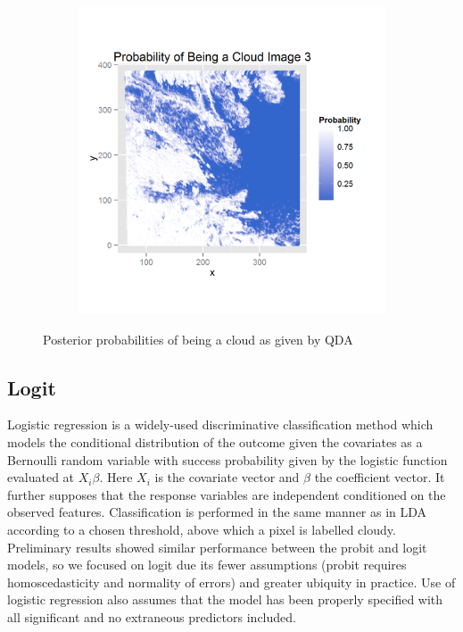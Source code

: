 \documentclass{article}\usepackage[]{graphicx}\usepackage[]{color}
\begin{document}
\begin{figure}[h]
\begin{subfigure}[b]{0.3\textwidth}
    \label{qda2}
  \end{subfigure}  
  \begin{subfigure}[b]{0.3\textwidth}
    \includegraphics[width=\linewidth]{qda3_prob.png}
    \label{qda3}
  \end{subfigure}  
  \caption{Posterior probabilities of being a cloud as given by QDA}
  \label{fig:QDA}
\end{figure}

\subsection{Logit}
Logistic regression is a widely-used discriminative classification method which models the conditional distribution of the outcome given the covariates as a Bernoulli random variable with success probability given by the logistic function evaluated at $X_i \beta$. Here $X_i$ is the covariate vector and $\beta$ the coefficient vector. It further supposes that the response variables are independent conditioned on the observed features. Classification is performed in the same manner as in LDA according to a chosen threshold, above which a pixel is labelled cloudy. Preliminary results showed similar performance between the probit and logit models, so we focused on logit due its fewer assumptions (probit requires homoscedasticity and normality of errors) and greater ubiquity in practice. Use of logistic regression also assumes that the model has been properly specified with all significant and no extraneous predictors included. 
\end{document}
